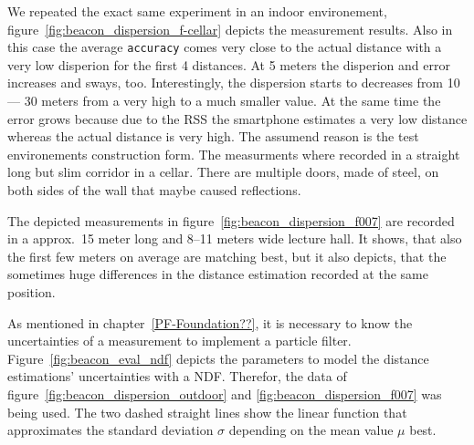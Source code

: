 We repeated the exact same experiment in an indoor environement, figure~\ref{fig:beacon_dispersion_f-cellar} depicts the measurement results.
Also in this case the average \texttt{accuracy} comes very close to the actual distance with a very low disperion for the first 4 distances.
At 5 meters the disperion and error increases and sways, too.
Interestingly, the dispersion starts to decreases from 10 --- 30 meters from a very high to a much smaller value.
At the same time the error grows because due to the \acs{RSS} the smartphone estimates a very low distance whereas the actual distance is very high.
The assumend reason is the test environements construction form. The measurments where recorded in a straight long but slim corridor in a cellar. There are multiple doors, made of steel, on both sides of the wall that maybe caused reflections.

The depicted measurements in figure~\ref{fig:beacon_dispersion_f007} are recorded in a approx.\ 15 meter long and 8--11 meters wide lecture hall.
It shows, that also the first few meters on average are matching best, but it also depicts, that the sometimes huge differences in the distance estimation recorded at the same position.

As mentioned in chapter~\ref{PF-Foundation??}, it is necessary to know the uncertainties of a measurement to implement a particle filter.
Figure~\ref{fig:beacon_eval_ndf} depicts the parameters to model the distance estimations' uncertainties with a \acs{NDF}.
Therefor, the data of figure~\ref{fig:beacon_dispersion_outdoor} and \ref{fig:beacon_dispersion_f007} was being used.
The two dashed straight lines show the linear function that approximates the standard deviation $\sigma$ depending on the mean value $\mu$ best.\\ \newline


